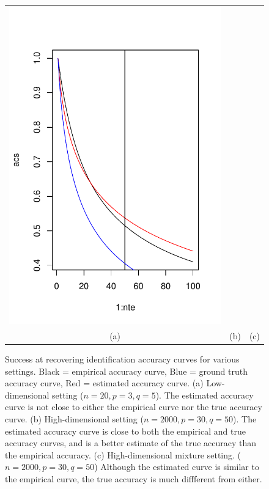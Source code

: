 \documentclass[12pt]{article}
\begin{document}
\begin{figure}
\begin{center}
\begin{tabular}{ccc}
\includegraphics[scale=0.4]{../info_theory_sims/fig_sim5c.pdf}\\
(a) & (b) & (c)
\end{tabular}
\end{center}
\label{fig:simulations}
\caption{Success at recovering identification accuracy curves for various settings.  Black = empirical accuracy curve, Blue = ground truth accuracy curve, Red = estimated accuracy curve. (a) Low-dimensional setting ($n = 20, p = 3, q = 5$).  The estimated accuracy curve is not close to either the empirical curve nor the true accuracy curve.  (b) High-dimensional setting ($n = 2000, p = 30, q = 50$).  The estimated accuracy curve is close to both the empirical and true accuracy curves, and is a better estimate of the true accuracy than the empirical accuracy.  (c) High-dimensional mixture setting. ($n = 2000, p = 30, q = 50$)  Although the estimated curve is similar to the empirical curve, the true accuracy is much diffferent from either.}
\end{figure}
\end{document}
